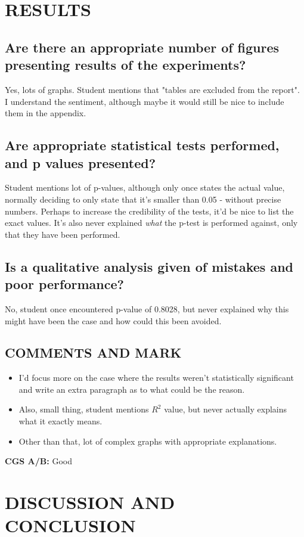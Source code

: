 \documentclass{article}
\begin{document}
\begin{normalsize}
\section{RESULTS}
\subsection{Are there an appropriate number of figures presenting results of the experiments?}
Yes, lots of graphs.
\bigbreak\noindent
Student mentions that "tables are excluded from the report". I understand the sentiment, although maybe it would still be nice to include them in the appendix.
\subsection{Are appropriate statistical tests performed, and p values presented?}
Student mentions lot of p-values, although only once states the actual value, normally deciding to only state that it's smaller than 0.05 - without precise numbers. Perhaps to increase the credibility of the tests, it'd be nice to list the exact values.
\bigbreak\noindent
It's also never explained \textit{what} the p-test is performed against, only that they have been performed. 
\subsection{Is a qualitative analysis given of mistakes and poor performance?}
No, student once encountered p-value of 0.8028, but never explained why this might have been the case and how could this been avoided.
\subsection{COMMENTS AND MARK}
\begin{itemize}
  \item I'd focus more on the case where the results weren't statistically significant and write an extra paragraph as to what could be the reason.
  \item Also, small thing, student mentions $R^2$ value, but never actually explains what it exactly means.
  \item Other than that, lot of complex graphs with appropriate explanations.
\end{itemize}
\textbf{CGS A/B: }Good
\section{DISCUSSION AND CONCLUSION}

\end{normalsize}
\end{document}
